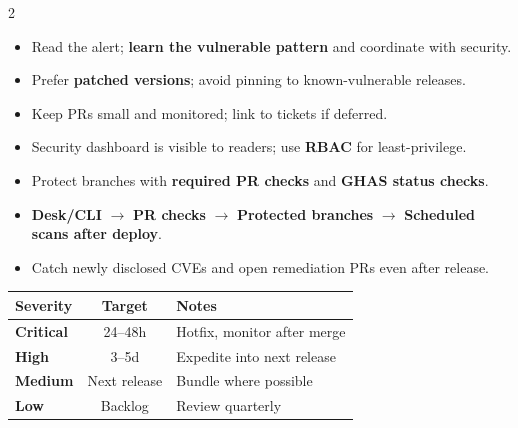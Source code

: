 \documentclass[11pt,letterpaper]{article}
\begin{document}
\begin{multicols}{2}
\begin{tcolorbox}[title=\bfseries Developer Responsibilities]
\begin{itemize}
  \item Read the alert; \textbf{learn the vulnerable pattern} and coordinate with security.
  \item Prefer \textbf{patched versions}; avoid pinning to known-vulnerable releases.
  \item Keep PRs small and monitored; link to tickets if deferred.
\end{itemize}
\end{tcolorbox}

\begin{tcolorbox}[title=\bfseries Access \& Visibility]
\begin{itemize}
  \item Security dashboard is visible to readers; use \textbf{RBAC} for least-privilege.
  \item Protect branches with \textbf{required PR checks} and \textbf{GHAS status checks}.
\end{itemize}
\end{tcolorbox}

\begin{tcolorbox}[title=\bfseries Where It Fits in the SDLC]
\begin{itemize}
  \item \textbf{Desk/CLI} \(\rightarrow\) \textbf{PR checks} \(\rightarrow\) \textbf{Protected branches} \(\rightarrow\) \textbf{Scheduled scans after deploy}.
  \item Catch newly disclosed CVEs and open remediation PRs even after release.
\end{itemize}
\end{tcolorbox}

\begin{tcolorbox}[title=\bfseries Suggested SLAs (example)]
\renewcommand{\arraystretch}{1.15}
\begin{tabularx}{\linewidth}{@{}>{\bfseries}l c X@{}}
\toprule
Severity & Target & Notes \\
\midrule
Critical & 24--48h & Hotfix, monitor after merge \\
High     & 3--5d   & Expedite into next release \\
Medium   & Next release & Bundle where possible \\
Low      & Backlog & Review quarterly \\
\bottomrule
\end{tabularx}
\end{tcolorbox}


\end{multicols}
\end{document}
